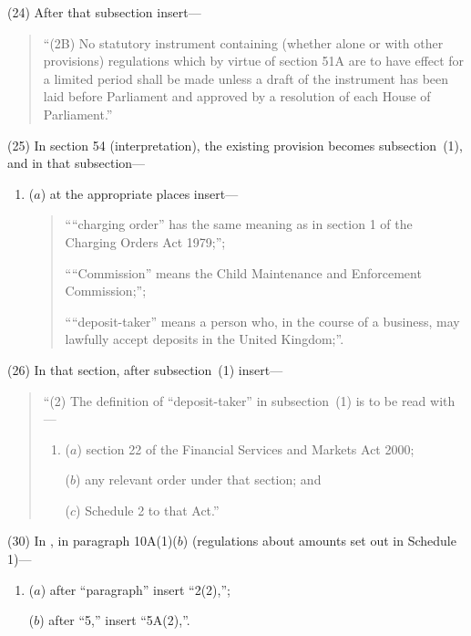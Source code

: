 \documentclass[12pt,a4paper]{article}
\begin{document}
(24) After that subsection insert—
\begin{quotation}
“(2B) No statutory instrument containing (whether alone or with other provisions) regulations which by virtue of section 51A are to have effect for a limited period shall be made unless a draft of the instrument has been laid before Parliament and approved by a resolution of each House of Parliament.”
\end{quotation}

(25) In section 54 (interpretation), the existing provision becomes subsection~(1), and in that subsection—
\begin{enumerate}\item[]
($a$) at the appropriate places insert—
\begin{quotation}
““charging order” has the same meaning as in section 1 of the Charging Orders Act 1979;”;

““Commission” means the Child Maintenance and Enforcement Commission;”;

““deposit-taker” means a person who, in the course of a business, may lawfully accept deposits in the United Kingdom;”.
\end{quotation}
\end{enumerate}

(26) In that section, after subsection~(1) insert—
\begin{quotation}
“(2) The definition of “deposit-taker” in subsection~(1) is to be read with—
\begin{enumerate}\item[]
($a$) section 22 of the Financial Services and Markets Act 2000;

($b$) any relevant order under that section; and

($c$) Schedule 2 to that Act.”
\end{enumerate}
\end{quotation}


(30) In , in paragraph 10A(1)($b$) (regulations about amounts set out in Schedule 1)—
\begin{enumerate}\item[]
($a$) after “paragraph” insert  “2(2),”;

($b$) after “5,” insert  “5A(2),”.
\end{enumerate}
\end{document}
